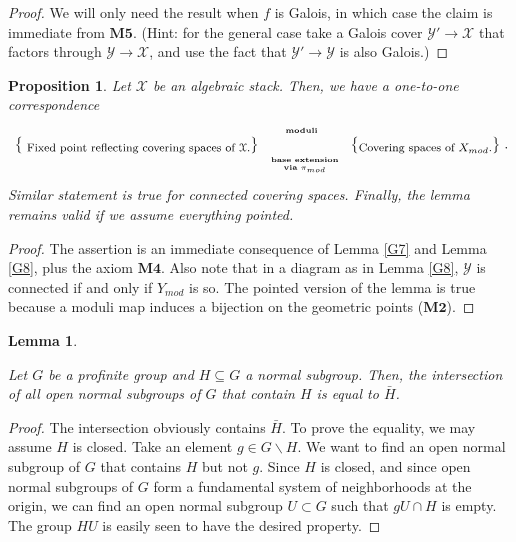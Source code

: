 \documentclass{amsart}
\newtheorem{lem}[thm]{Lemma}
\newtheorem{prop}[thm]{Proposition}
\theoremstyle{definition}
\theoremstyle{remark}
\theoremstyle{remark}
\newcommand{\X}{\mathcal{X}}
\newcommand{\Y}{\mathcal{Y}}
\newcommand{\Xm}{X_{mod}}
\newcommand{\Ym}{Y_{mod}}
\begin{document}
\begin{proof}
We will only need the result when $f$ is Galois, in which case the
claim is immediate from $\mathbf{M5}$. (Hint: for the general case
take a Galois cover $\Y' \to \X$ that factors through $\Y \to \X$,
and use the fact that $\Y' \to \Y$ is also Galois.)
\end{proof}

\begin{prop}{\label{G9}}
Let $\X$ be an algebraic stack. Then,  we have a one-to-one
correspondence $$\xymatrix@C=60pt{ \left\{ \txt\footnotesize{
Fixed point reflecting covering spaces of $\X$.}\right\} \ar
@/^/[r]^(0.57){\txt\tiny{\bf{moduli}}}  &
\left\{\txt\footnotesize{Covering spaces of $\Xm$. }\right\}  \ar
@/^/ [l]^(0.42){\txt\tiny{\bf{base extension}\\ {\bf via}
$\pi_{mod}$}}}.$$ \noindent Similar statement is true for
connected covering spaces. Finally, the lemma remains valid if we
assume everything  pointed.
\end{prop}

\begin{proof}
The assertion is an immediate consequence of Lemma \ref{G7} and
Lemma \ref{G8}, plus the axiom $\mathbf{M4}$. Also note that in a
diagram as in Lemma \ref{G8}, $\Y$ is connected if and only if
$\Ym$ is so. The pointed version of the lemma is true because a
moduli map induces a bijection on the geometric points
($\mathbf{M2}$).
\end{proof}

\begin{lem}{\label{G10}}

Let $G$ be a profinite group and $H \subseteq G$ a normal
subgroup. Then, the intersection of all open normal subgroups of
$G$ that contain $H$ is equal to $\bar{H}$.
\end{lem}

\begin{proof}

The intersection obviously contains $\bar{H}$. To prove the
equality, we may assume $H$ is closed. Take an element $g \in G
\backslash H$. We want to find an open normal subgroup of $G$ that
contains $H$ but not $g$. Since $H$ is closed, and since open
normal subgroups of $G$ form a fundamental system of neighborhoods
at the origin, we can find an open normal subgroup $U \subset G$
such that $gU \cap H$ is empty. The group $HU$ is easily seen to
have the desired property.
\end{proof}
\end{document}
